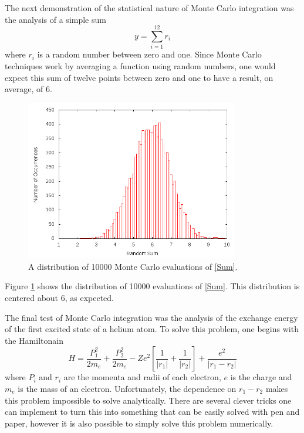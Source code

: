 \documentclass[12pt]{article}
\begin{document}
The next demonstration of the statistical nature of Monte Carlo integration was the analysis of a simple sum
\begin{equation}
\label{Sum}
y = \sum_{i=1}^{12} r_i
\end{equation}
where $r_i$ is a random number between zero and one.  Since Monte Carlo techniques work by averaging a function using random numbers, one would expect this sum of twelve points between zero and one to have a result, on average, of 6.  
\begin{figure}[!h]
\centering
\includegraphics[width =120 mm, height = 70mm]{Ex_12_10.png}
\caption{A distribution of 10000 Monte Carlo evaluations of \eqref{Sum}.}
\label{fig:Monte6}
\end{figure}
Figure \ref{fig:Monte6} shows the distribution of 10000 evaluations of \eqref{Sum}.  This distribution is centered about 6, as expected.  

The final test of Monte Carlo integration was the analysis of the exchange energy of the first excited state of a helium atom.  To solve this problem, one begins with the Hamiltonain
\begin{equation}
\label{Ham}
H = \frac{P_1^2}{2m_e}+\frac{P_2^2}{2m_e}-Ze^2[\frac{1}{|r_1|}+\frac{1}{|r_2|}]+\frac{e^2}{|r_1-r_2|}
\end{equation}
where $P_i$ and $r_i$ are the momenta and radii of each electron, $e$ is the charge and $m_e$ is the mass of an electron.  Unfortunately, the dependence on $r_1-r_2$ makes this problem impossible to solve analytically.  There are several clever tricks one can implement to turn this into something that can be easily solved with pen and paper, however it is also possible to simply solve this problem numerically.
\end{document}
